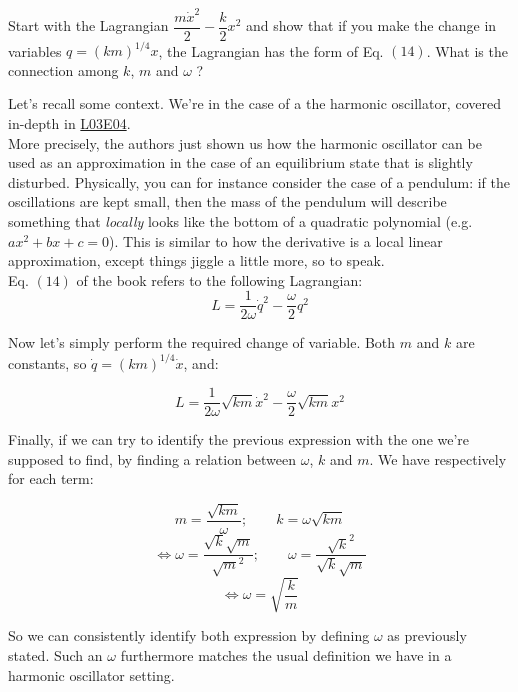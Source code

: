 \documentclass[solutions.tex]{subfiles}
\begin{document}
\maketitle
\begin{exercise}
Start with the Lagrangian $\dfrac{m\dot{x}^2}{2}-\dfrac{k}{2}x^2$ and
show that if you make the change in variables $q=(k m )^{1/4}x$, the Lagrangian
has the form of Eq. $(14)$. What is the connection among $k$, $m$
and $\omega$ ?
\end{exercise}
Let's recall some context. We're in the case of a the
harmonic oscillator, covered in-depth in
\href{https://tales.mbivert.com/on-the-harmonic-oscillator/}{L03E04}. \\

More precisely, the authors just shown us how the harmonic
oscillator can be used as an approximation in the case of
an equilibrium state that is slightly disturbed. Physically,
you can for instance consider the case of a pendulum: if the
oscillations are kept small, then the mass of the pendulum
will describe something that \textit{locally} looks like
the bottom of a quadratic polynomial (e.g. $ax^2+bx+c = 0$).
This is similar to how the derivative is a local linear
approximation, except things jiggle a little more,
so to speak. \\

Eq. $(14)$ of the book refers to the following Lagrangian:
\[
	L = \frac{1}{2\omega}\dot{q}^2 - \frac{\omega}{2}q^2
\]

Now let's simply perform the required change of variable.
Both $m$ and $k$ are constants, so $\dot{q} = (km)^{1/4}\dot{x}$,
and:

\[
	L = \frac{1}{2\omega}\sqrt{km}\dot{x}^2 - \frac{\omega}{2}\sqrt{km}x^2
\]

Finally, if we can try to identify the previous expression with the
one we're supposed to find, by finding a relation between $\omega$, $k$
and $m$. We have respectively for each term:

\[ m = \frac{\sqrt{km}}\omega;\qquad k = \omega\sqrt{km} \]
\[
	\Leftrightarrow
	\omega = \frac{\sqrt{k}\sqrt{m}}{\sqrt{m}^2};\qquad
	\omega = \frac{\sqrt{k}^2}{\sqrt{k}\sqrt{m}}
\]
\[
	\Leftrightarrow
	\boxed{\omega = \sqrt{\frac{k}m}}
\]

So we can consistently identify both expression by defining $\omega$
as previously stated. Such an $\omega$ furthermore matches the usual
definition we have in a harmonic oscillator setting.
\end{document}
